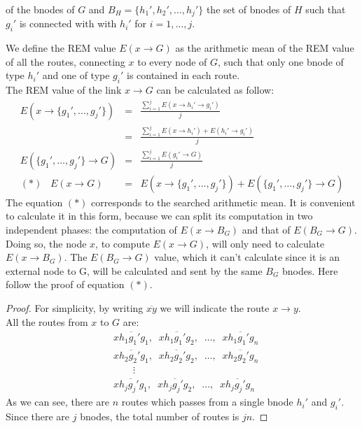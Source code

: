 \documentclass[a4paper]{article}
\begin{document}
\begin{enumerate}
\begin{enumerate}
				of the bnodes of $G$ and $B_H=\{h_1', h_2',
				\dots,h_j'\}$ the set of bnodes of $H$ such
				that $g_i'$ is connected with with $h_i'$ for
				$i=1,\dots,j$.
		\end{enumerate}
		We define the REM value $E(x\rightarrow G)$
		as the arithmetic mean of the REM value of all the routes, connecting
		$x$ to every node of $G$, such that only one bnode of type $h_i'$ and
		one of type $g_i'$ is contained in each route.\\
		The REM value of the link $x\rightarrow G$ can be calculated as
		follow:\\
		\begin{eqnarray*}
		E(x \rightarrow \{g_1',\dots,g_j'\})&=&
				\frac{\sum_{i=1}^j E(x \rightarrow h_i' \rightarrow g_i')}
						{j}\\
				&=&
				\frac{\sum_{i=1}^j E(x \rightarrow
				h_i')+E(h_i' \rightarrow g_i')}{j}\\
		E(\{g_1',\dots,g_j'\}\rightarrow G)&=&
				\frac{\sum_{i=1}^j E(g_i'\rightarrow G)}{j}\\
		(*)\;\;\;E(x\rightarrow G)&=&
			E(x \rightarrow \{g_1',\dots,g_j'\}) + E(\{g_1',\dots,g_j'\}\rightarrow G)
		\end{eqnarray*}
		The equation $(*)$ corresponds to the searched arithmetic mean. 
		It is convenient to calculate it in this form, because we can
		split its computation in two independent phases: the
		computation of $E(x\rightarrow B_G)$ and that of
		$E(B_G\rightarrow G)$. Doing so, the node $x$, to compute
		$E(x\rightarrow G)$,  will only need
		to calculate $E(x\rightarrow B_G)$. The $E(B_G\rightarrow G)$
		value, which it can't calculate since it is an external node
		to G, will be calculated and sent by the same $B_G$ bnodes.
		Here follow the proof of equation $(*)$.
		\begin{proof}
			\label{proofrem1}
			For simplicity, by writing $\overline{xy}$ we will indicate the route $x
			\rightarrow y$.\\
			All the routes from $x$ to $G$ are:
			\begin{align*}
				&\overline{x h_1  g_1'  g_1},\;\; \overline{x
				h_1  g_1'g_2},\;\;\dots,\;\; \overline{x h_1
				g_1'  g_n}\\
				&\overline{x h_2  g_2'  g_1},\;\; \overline{x
				h_2  g_2'g_2},\;\;\dots,\;\; \overline{x h_2
				g_2'  g_n}\\
				&\qquad \vdots\\
				&\overline{x h_j  g_j'  g_1},\;\; \overline{x
				h_j  g_j'g_2},\;\;\dots,\;\; \overline{x h_j
				g_j'  g_n}
			\end{align*}
			As we can see, there are $n$ routes which passes from
			a single bnode $h_i'$ and $g_i'$. Since there are $j$
			bnodes, the total number of routes is $jn$.


\end{proof}
\end{enumerate}
\end{document}
